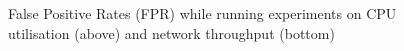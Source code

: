 %       
%      


\begin{figure}[!h]
  \centering
   {}
      {}
   \caption{False Positive Rates (FPR) while running experiments on CPU utilisation (above) and network throughput (bottom)}
  \label{fig:offline_cpu_network}
\end{figure}


